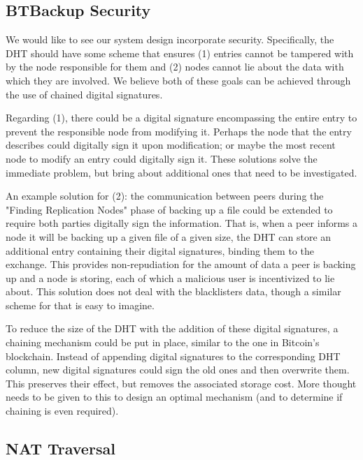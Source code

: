 \documentclass[12pt]{report}
\begin{document}
\subsection{BTBackup Security} \label{subsec:BTBackupSecurity}

We would like to see our system design incorporate security. Specifically, the DHT should have some scheme that ensures (1) entries cannot be tampered with by the node responsible for them and (2) nodes cannot lie about the data with which they are involved. We believe both of these goals can be achieved through the use of chained digital signatures.

Regarding (1), there could be a digital signature encompassing the entire entry to prevent the responsible node from modifying it. Perhaps the node that the entry describes could digitally sign it upon modification; or maybe the most recent node to modify an entry could digitally sign it. These solutions solve the immediate problem, but bring about additional ones that need to be investigated.

An example solution for (2): the communication between peers during the "Finding Replication Nodes" phase of backing up a file could be extended to require both parties digitally sign the information. That is, when a peer informs a node it will be backing up a given file of a given size, the DHT can store an additional entry containing their digital signatures, binding them to the exchange. This provides non-repudiation for the amount of data a peer is backing up and a node is storing, each of which a malicious user is incentivized to lie about. This solution does not deal with the blacklisters data, though a similar scheme for that is easy to imagine.

To reduce the size of the DHT with the addition of these digital signatures, a chaining mechanism could be put in place, similar to the one in Bitcoin's blockchain. Instead of appending digital signatures to the corresponding DHT column, new digital signatures could sign the old ones and then overwrite them. This preserves their effect, but removes the associated storage cost. More thought needs to be given to this to design an optimal mechanism (and to determine if chaining is even required).


\subsection{NAT Traversal}
\end{document}
